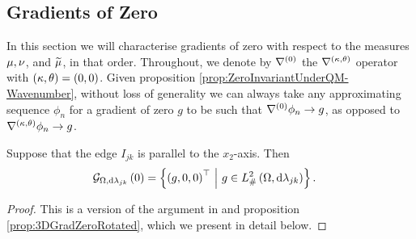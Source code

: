 \subsection{Gradients of Zero} \label{ssec:muGradZero}
In this section we will characterise gradients of zero with respect to the measures $\mu, \nu$, and $\widetilde{\mu}$, in that order.
Throughout, we denote by $\nabla^{(0)}$ the $\nabla^{\left( \kappa, \theta \right)}$ operator with $\left( \kappa, \theta \right)=\left( 0,0 \right)$.
Given proposition \ref{prop:ZeroInvariantUnderQM-Wavenumber}, without loss of generality we can always take any approximating sequence $\phi_n$ for a gradient of zero $g$ to be such that $\nabla^{(0)}\phi_n\rightarrow g$, as opposed to $\nabla^{\left( \kappa, \theta \right)}\phi_n\rightarrow g$.
\begin{prop} \label{prop:3DGradZeroParallel}
	Suppose that the edge $I_{jk}$ is parallel to the $x_2$-axis.
	Then 
	\begin{align*}
		\mathcal{G}_{ \Omega, \mathrm{d}\lambda_{jk}}\left( 0 \right) &= 
		\left\{  \left( g,0,0 \right)^\top	\ \middle\vert \  g\in L^2_{\#}\left( \Omega,\mathrm{d} \lambda_{jk} \right)  \right\}.
	\end{align*}
\end{prop}
\begin{proof}
	This is a version of the argument in \cite[Section~3.1]{zhikov2000extension} and proposition \ref{prop:3DGradZeroRotated}, which we present in detail below.
\end{proof}

